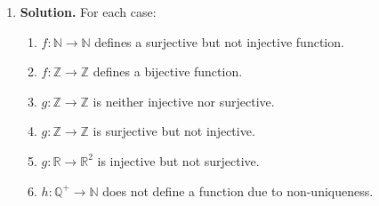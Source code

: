 \documentclass[12pt]{article}
\begin{document}
\begin{enumerate}
    \item \textbf{Solution.}
    For each case:
    \begin{enumerate}
        \item $f : \mathbb{N} \to \mathbb{N}$ defines a surjective but not injective function.
        \item $f : \mathbb{Z} \to \mathbb{Z}$ defines a bijective function.
        \item $g : \mathbb{Z} \to \mathbb{Z}$ is neither injective nor surjective.
        \item $g : \mathbb{Z} \to \mathbb{Z}$ is surjective but not injective.
        \item $g : \mathbb{R} \to \mathbb{R}^2$ is injective but not surjective.
        \item $h : \mathbb{Q}^+ \to \mathbb{N}$ does not define a function due to non-uniqueness.
    \end{enumerate}
\end{enumerate}
\end{document}
